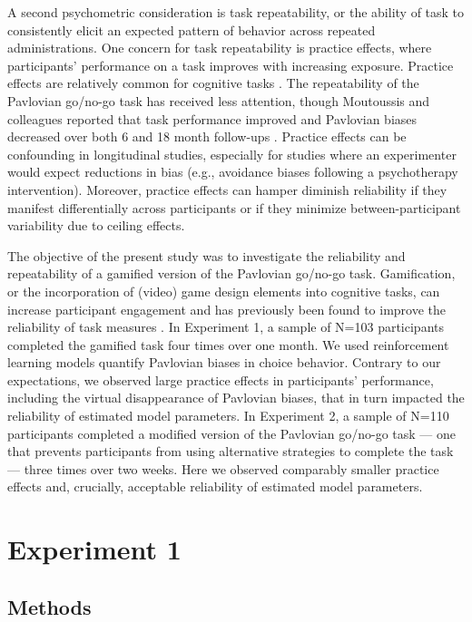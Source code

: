 \documentclass[a4paper,12pt]{article}
\begin{document}
\begin{refsection}[main]
A second psychometric consideration is task repeatability, or the ability of task to consistently elicit an expected pattern of behavior across repeated administrations. One concern for task repeatability is practice effects, where participants’ performance on a task improves with increasing exposure. Practice effects are relatively common for cognitive tasks \cite{hausknecht2007retesting, scharfen2018retest}. The repeatability of the Pavlovian go/no-go task has received less attention, though Moutoussis and colleagues reported that task performance improved and Pavlovian biases decreased over both 6 and 18 month follow-ups \cite{moutoussis2018change}. Practice effects can be confounding in longitudinal studies, especially for studies where an experimenter would expect reductions in bias (e.g., avoidance biases following a psychotherapy intervention). Moreover, practice effects can hamper diminish reliability if they manifest differentially across participants or if they minimize between-participant variability due to ceiling effects. 

The objective of the present study was to investigate the reliability and repeatability of a gamified version of the Pavlovian go/no-go task. Gamification, or the incorporation of (video) game design elements into cognitive tasks, can increase participant engagement \cite{sailer2017gamification} and has previously been found to improve the reliability of task measures \cite{kucina2022solution, verdejo2021unified}. In Experiment 1, a sample of N=103 participants completed the gamified task four times over one month. We used reinforcement learning models quantify Pavlovian biases in choice behavior. Contrary to our expectations, we observed large practice effects in participants' performance, including the virtual disappearance of Pavlovian biases, that in turn impacted the reliability of estimated model parameters. In Experiment 2, a sample of N=110 participants completed a modified version of the Pavlovian go/no-go task --- one that prevents participants from using alternative strategies to complete the task --- three times over two weeks. Here we observed comparably smaller practice effects and, crucially, acceptable reliability of estimated model parameters.

\section*{Experiment 1}

\subsection*{Methods}


\end{refsection}
\end{document}
